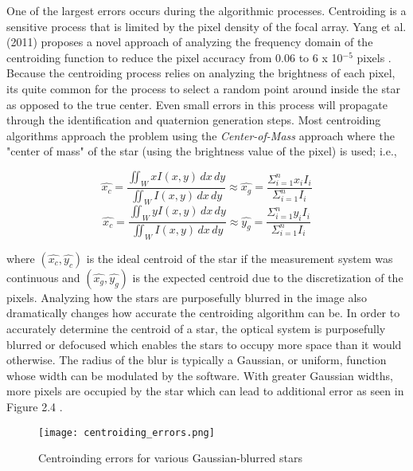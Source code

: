 \par \qquad One of the largest errors occurs during the algorithmic processes.
Centroiding is a sensitive process that is limited by the pixel density of the focal array.
Yang et al. (2011) proposes a novel approach of analyzing the frequency domain of the centroiding function to reduce the pixel accuracy from 0.06 to 6 x 10$^{-5}$ pixels \cite{centroiding_errors}. 
Because the centroiding process relies on analyzing the brightness of each pixel, its quite common for the process to select a random point around inside the star as opposed to the true center.
Even small errors in this process will propagate through the identification and quaternion generation steps.
Most centroiding algorithms approach the problem using the \emph{Center-of-Mass} approach where the "center of mass" of the star (using the brightness value of the pixel) is used; i.e., 

\begin{equation*}
    \hat{x_{c}} = \frac{\iint_{W} xI(x,y)\,dx\,dy}{\iint_{W}I(x,y)\,dx\,dy} \approx \hat{x_{g}} = \frac{\Sigma^{n}_{i=1} x_iI_i}{\Sigma^{n}_{i=1}I_i}
\end{equation*}
\begin{equation}
    \hat{x_{c}} = \frac{\iint_{W} yI(x,y)\,dx\,dy}{\iint_{W}I(x,y)\,dx\,dy} \approx \hat{y_{g}} = \frac{\Sigma^{n}_{i=1} y_iI_i}{\Sigma^{n}_{i=1}I_i} 
\end{equation}

where $(\hat{x_c}, \hat{y_c})$ is the ideal centroid of the star if the measurement system was continuous and $(\hat{x_g}, \hat{y_g})$ is the expected centroid due to the discretization of the pixels.
Analyzing how the stars are purposefully blurred in the image also dramatically changes how accurate the centroiding algorithm can be.
In order to accurately determine the centroid of a star, the optical system is purposefully blurred or defocused which enables the stars to occupy more space than it would otherwise.
The radius of the blur is typically a Gaussian, or uniform, function whose width can be modulated by the software.
With greater Gaussian widths, more pixels are occupied by the star which can lead to additional error as seen in Figure 2.4 \cite{centroiding_errors}.

\begin{figure}[h]\label{centroiding_width_errors}
    \texttt{[image: centroiding\_errors.png]} 
    \caption{Centroinding errors for various Gaussian-blurred stars}
\end{figure}

